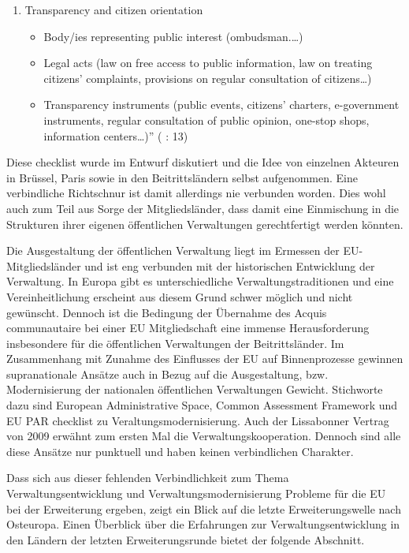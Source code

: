 \begin{enumerate}
\begin{itemize}
\end{itemize}
\item Transparency and citizen orientation 
\begin{itemize} \itemsep1pt \parskip0pt 
\item Body/ies representing public interest (ombudsman.…)
\item Legal acts (law on free access to public information, law on treating citizens’ complaints, provisions on regular consultation of citizens…) 
\item Transparency instruments (public events, citizens’ charters, e-government instruments, regular consultation of public opinion, one-stop shops, information centers…)”
(\cite{butiu} : 13)
\end{itemize}
\end{enumerate}

Diese checklist wurde im Entwurf diskutiert und die Idee von einzelnen Akteuren in Brüssel, Paris sowie in den Beitrittsländern selbst aufgenommen. Eine verbindliche Richtschnur ist damit allerdings nie verbunden worden. Dies wohl auch zum Teil aus Sorge der Mitgliedsländer, dass damit eine Einmischung in die Strukturen ihrer eigenen öffentlichen Verwaltungen gerechtfertigt werden könnten. \par
Die Ausgestaltung der öffentlichen Verwaltung liegt im Ermessen der EU-Mitgliedsländer und ist eng verbunden mit der historischen Entwicklung der Verwaltung. In Europa gibt es unterschiedliche Verwaltungstraditionen und eine Vereinheitlichung erscheint aus diesem Grund schwer möglich und nicht gewünscht. Dennoch ist die Bedingung der Übernahme des Acquis communautaire bei einer EU Mitgliedschaft eine immense Herausforderung insbesondere für die öffentlichen Verwaltungen der Beitrittsländer. Im Zusammenhang mit Zunahme des Einflusses der EU auf Binnenprozesse gewinnen supranationale Ansätze auch in Bezug auf die Ausgestaltung, bzw. Modernisierung der nationalen öffentlichen Verwaltungen Gewicht. Stichworte dazu sind European Administrative Space, Common Assessment Framework und EU PAR checklist zu Veraltungsmodernisierung. Auch der Lissabonner Vertrag von 2009 erwähnt zum ersten Mal die Verwaltungskooperation. Dennoch sind alle diese Ansätze nur punktuell und haben keinen verbindlichen Charakter.\par
Dass sich aus dieser fehlenden Verbindlichkeit zum Thema Verwaltungsentwicklung und Verwaltungsmodernisierung Probleme für die EU bei der Erweiterung ergeben, zeigt ein Blick auf die letzte Erweiterungswelle nach Osteuropa. Einen Überblick über die Erfahrungen zur Verwaltungsentwicklung in den Ländern der letzten Erweiterungsrunde bietet der folgende Abschnitt.

